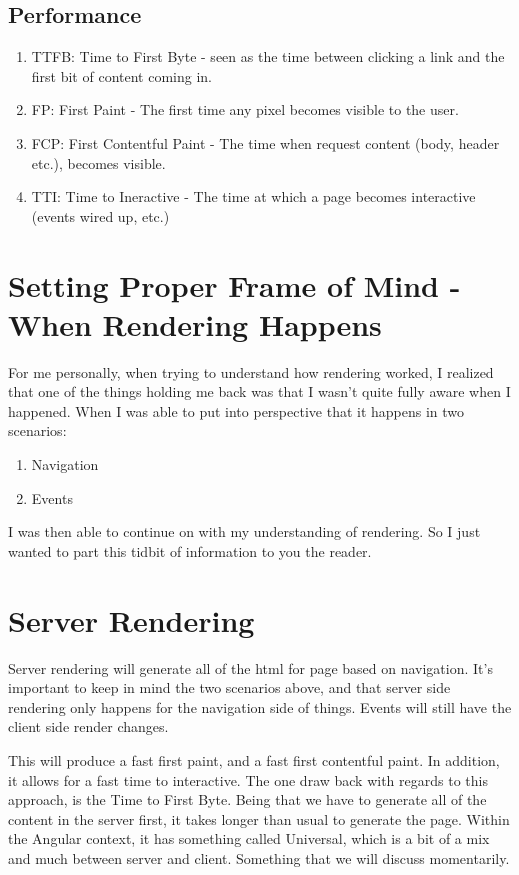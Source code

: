 \subsection{Performance}
\begin{enumerate}
  \item TTFB: Time to First Byte - seen as the time between clicking a link and the first bit of content coming in.
  \item FP: First Paint - The first time any pixel becomes visible to the user.
  \item FCP: First Contentful Paint - The time when request content (body, header etc.), becomes visible. 
  \item TTI: Time to Ineractive - The time at which a page becomes interactive (events wired up, etc.)
\end{enumerate}

\section{ Setting Proper Frame of Mind - When Rendering Happens }
For me personally, when trying to understand how rendering worked, I realized that one of the things holding me back was that I wasn't quite fully aware when I happened. When I was able to put into perspective that it happens in two scenarios: 
\begin{enumerate}
  \item Navigation 
  \item Events
\end{enumerate}

I was then able to continue on with my understanding of rendering. So I just wanted to part this tidbit of information to you the reader.

\section{Server Rendering}
Server rendering will generate all of the html for page based on navigation. It's important to keep in mind the two scenarios above, and that server side rendering only happens for the navigation side of things. Events will still have the client side render changes. 

This will produce a fast first paint, and a fast first contentful paint. In addition, it allows for a fast time to interactive. The one draw back with regards to this approach, is the Time to First Byte. Being that we have to generate all of the content in the server first, it takes longer than usual to generate the page. Within the Angular context, it has something called Universal, which is a bit of a mix and much between server and client. Something that we will discuss momentarily. 
